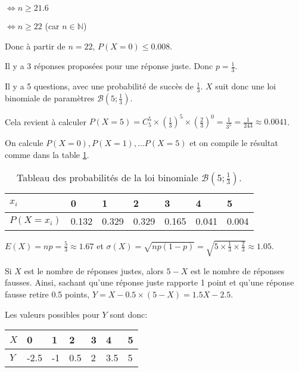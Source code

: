 \documentclass[a4paper,12pt]{scrartcl}
\begin{document}
$\Leftrightarrow n \geqslant 21.6$

$\Leftrightarrow n \geqslant 22$ (car $n \in \mathbb{N}$)

Donc à partir de $n = 22$, $P(X=0) \leqslant 0.008$. 


\question{}

\subquestion{}
Il y a 3 réponses proposées pour une réponse juste. Donc $p = \frac{1}{3}$.

\subquestion{}
Il y a 5 questions, avec une probabilité de succès de $\frac{1}{3}$. $X$ suit donc une loi binomiale de paramètres $\mathcal{B} \left(5;\frac{1}{3} \right)$.

\subquestion{}
Cela revient à calculer $P(X=5) = C_5^5 \times \left(\frac{1}{3}\right)^5 \times \left(\frac{2}{3}\right)^0 = \frac{1}{3^5} = \frac{1}{243} \approx 0.0041$.


On calcule $P(X=0), P(X=1), \ldots P(X=5)$ et on compile le résultat comme dans la table \ref{tab:truc}.

\begin{table}[h]
\centering
\begin{tabular}{|l|l|l|l|l|l|l|}
\hline
$x_i$        & 0     & 1     & 2     & 3     & 4     & 5     \\ \hline
$P(X = x_i)$ & 0.132 & 0.329 & 0.329 & 0.165 & 0.041 & 0.004 \\ \hline
\end{tabular}
\caption{Tableau des probabilités de la loi binomiale $\mathcal{B}\left(5;\frac{1}{3}\right)$.}
\label{tab:truc}
\end{table}

$E(X) = np = \frac{5}{3} \approx 1.67$ et $\sigma(X) = \sqrt{np(1-p)} = \sqrt{5 \times \frac{1}{3} \times \frac{2}{3}} \approx 1.05$. 


\subquestion{}
Si $X$ est le nombre de réponses justes, alors $5-X$ est le nombre de réponses fausses. Ainsi, sachant qu'une réponse juste rapporte 1 point et qu'une réponse fausse retire 0.5 points, $Y = X - 0.5 \times (5-X) = 1.5X-2.5$.

Les valeurs possibles pour $Y$ sont donc:

\begin{tabular}{|l|l|l|l|l|l|l|}
\hline
$X$        & 0     & 1     & 2     & 3     & 4     & 5     \\ \hline
$Y$        &-2.5   &-1     & 0.5   & 2     & 3.5   & 5
 \\ \hline
\end{tabular}
\end{document}

